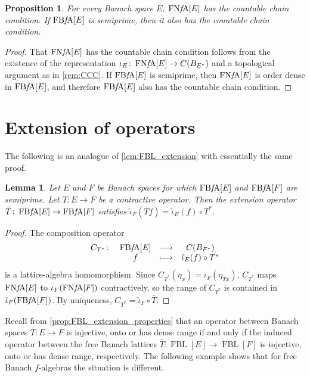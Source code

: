 \documentclass{memo-l}
\newtheorem{lem}[theorem]{Lemma}
\newtheorem{prop}[theorem]{Proposition}
\theoremstyle{definition}
\theoremstyle{remark}
\numberwithin{section}{chapter}
\numberwithin{equation}{chapter}
\newcommand{\falg}{$f\!$-algebra}
\newcommand{\FNFA}[1]{\operatorname{FN{\it f}\!A}[#1]}
\newcommand{\FBFA}[1]{\operatorname{FB{\it f}\!A}[#1]}
\newcommand{\FBL}[1]{\operatorname{FBL}[#1]}
\begin{document}
\begin{prop}
    For every Banach space $E$, $\FNFA E$ has the countable chain
    condition. If $\FBFA E$ is semiprime, then it also has the
    countable chain condition.
\end{prop}
\begin{proof}
    That $\FNFA E$ has the countable chain condition follows from the
    existence of the representation $\iota _E\colon \FNFA E\to
    C(B_{E^{*}})$ and a topological argument as in \cref{rem:CCC}. If
    $\FBFA E$ is semiprime, then $\FNFA E$ is order dense in $\FBFA
    E$, and therefore $\FBFA E$ also has the countable chain
    condition.
\end{proof}

\section{Extension of operators}

The following is an analogue of \cref{lem:FBL_extension} with
essentially the same proof.

\begin{lem}\label{lem:extension}
    Let $E$ and $F$ be Banach spaces for which $\FBFA E$ and $\FBFA F$
    are semiprime. Let $T\colon E\to F$ be a contractive operator.
    Then the
    extension operator $\bar{T}\colon \FBFA E\to \FBFA F$ satisfies
    $\hat{\iota}_F(\bar{T}f)=\hat{\iota}_E (f)\circ T^{*}$.
\end{lem}
\begin{proof}
    The composition operator
    \[
    \begin{array}{cccc}
    C_{T^{*}}\colon& \FBFA E & \longrightarrow & C(B_{F^{*}}) \\
            & f & \longmapsto & \hat{\iota }_E(f)\circ T^{*} \\
    \end{array}
    \]
    is a lattice-algebra homomorphism. Since
    $C_{T^{*}}(\eta _x)=\iota_{F}(\eta _{Tx})$, $C_{T^{*}}$ maps $\FNFA E$ to
    $\iota_{F} (\FNFA F)$ contractively, so the range of $C_{T^{*}}$ is contained
    in $\hat{\iota }_F(\FBFA F)$. By uniqueness,
    $C_{T^{*}}=\hat{\iota }_F\circ\bar{T}$.
\end{proof}

Recall from \cref{prop:FBL_extension_properties} that an operator
between Banach spaces $T\colon E\to F$ is injective, onto or has
dense range if and only if the induced operator between the free
Banach lattices $\bar{T}\colon \FBL E\to \FBL F$ is injective, onto
or has dense range, respectively. The following example shows that
for free Banach \falg s the situation is different.
\end{document}
